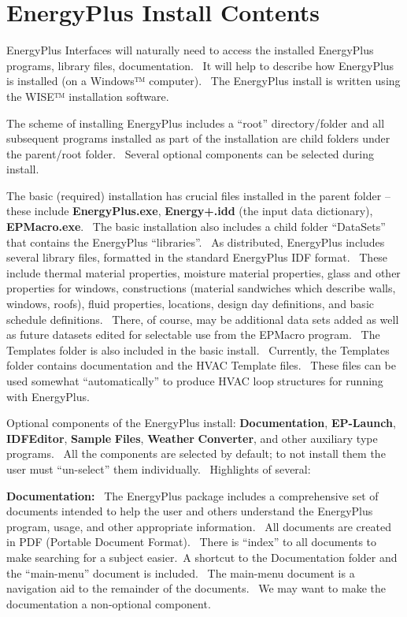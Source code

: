 \chapter{EnergyPlus Install Contents}\label{energyplus-install-contents}

EnergyPlus Interfaces will naturally need to access the installed EnergyPlus programs, library files, documentation.~ It will help to describe how EnergyPlus is installed (on a Windows™ computer).~ The EnergyPlus install is written using the WISE™ installation software.

The scheme of installing EnergyPlus includes a ``root'' directory/folder and all subsequent programs installed as part of the installation are child folders under the parent/root folder.~ Several optional components can be selected during install.

The basic (required) installation has crucial files installed in the parent folder -- these include \textbf{EnergyPlus.exe}, \textbf{Energy+.idd} (the input data dictionary), \textbf{EPMacro.exe}.~ The basic installation also includes a child folder ``DataSets'' that contains the EnergyPlus ``libraries''.~ As distributed, EnergyPlus includes several library files, formatted in the standard EnergyPlus IDF format.~ These include thermal material properties, moisture material properties, glass and other properties for windows, constructions (material sandwiches which describe walls, windows, roofs), fluid properties, locations, design day definitions, and basic schedule definitions.~ There, of course, may be additional data sets added as well as future datasets edited for selectable use from the EPMacro program.~ The Templates folder is also included in the basic install.~ Currently, the Templates folder contains documentation and the HVAC Template files.~ These files can be used somewhat ``automatically'' to produce HVAC loop structures for running with EnergyPlus.

Optional components of the EnergyPlus install: \textbf{Documentation}, \textbf{EP-Launch}, \textbf{IDFEditor}, \textbf{Sample} \textbf{Files}, \textbf{Weather} \textbf{Converter}, and other auxiliary type programs.~ All the components are selected by default; to not install them the user must ``un-select'' them individually.~ Highlights of several:

\textbf{Documentation:}~ The EnergyPlus package includes a comprehensive set of documents intended to help the user and others understand the EnergyPlus program, usage, and other appropriate information.~ All documents are created in PDF (Portable Document Format).~ There is ``index'' to all documents to make searching for a subject easier.~A shortcut to the Documentation folder and the ``main-menu'' document is included.~ The main-menu document is a navigation aid to the remainder of the documents.~ We may want to make the documentation a non-optional component.

